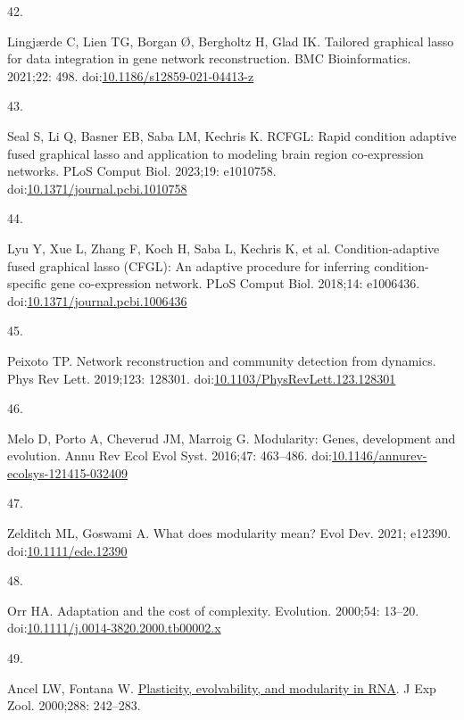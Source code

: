 \documentclass[
]{article}
\newlength{\cslhangindent}
\newlength{\csllabelwidth}
\newenvironment{CSLReferences}[2] %
 {\begin{list}{}{%
  \setlength{\itemindent}{0pt}
  \setlength{\leftmargin}{0pt}
  \setlength{\parsep}{0pt}
  \ifodd #1
   \setlength{\leftmargin}{\cslhangindent}
   \setlength{\itemindent}{-1\cslhangindent}
  \fi
  \setlength{\itemsep}{#2\baselineskip}}}
 {\end{list}}
\newcommand{\CSLLeftMargin}[1]{\parbox[t]{\csllabelwidth}{\strut#1\strut}}
\newcommand{\CSLRightInline}[1]{\parbox[t]{\linewidth - \csllabelwidth}{\strut#1\strut}}
\begin{document}
\begin{CSLReferences}{0}{1}
\CSLLeftMargin{42. }%
\CSLRightInline{Lingjærde C, Lien TG, Borgan Ø, Bergholtz H, Glad IK.
Tailored graphical lasso for data integration in gene network
reconstruction. BMC Bioinformatics. 2021;22: 498.
doi:\href{https://doi.org/10.1186/s12859-021-04413-z}{10.1186/s12859-021-04413-z}}

\CSLLeftMargin{43. }%
\CSLRightInline{Seal S, Li Q, Basner EB, Saba LM, Kechris K. {RCFGL}:
Rapid condition adaptive fused graphical lasso and application to
modeling brain region co-expression networks. PLoS Comput Biol. 2023;19:
e1010758.
doi:\href{https://doi.org/10.1371/journal.pcbi.1010758}{10.1371/journal.pcbi.1010758}}

\CSLLeftMargin{44. }%
\CSLRightInline{Lyu Y, Xue L, Zhang F, Koch H, Saba L, Kechris K, et al.
Condition-adaptive fused graphical lasso ({CFGL)}: An adaptive procedure
for inferring condition-specific gene co-expression network. PLoS Comput
Biol. 2018;14: e1006436.
doi:\href{https://doi.org/10.1371/journal.pcbi.1006436}{10.1371/journal.pcbi.1006436}}

\CSLLeftMargin{45. }%
\CSLRightInline{Peixoto TP. Network reconstruction and community
detection from dynamics. Phys Rev Lett. 2019;123: 128301.
doi:\href{https://doi.org/10.1103/PhysRevLett.123.128301}{10.1103/PhysRevLett.123.128301}}

\CSLLeftMargin{46. }%
\CSLRightInline{Melo D, Porto A, Cheverud JM, Marroig G. Modularity:
Genes, development and evolution. Annu Rev Ecol Evol Syst. 2016;47:
463--486.
doi:\href{https://doi.org/10.1146/annurev-ecolsys-121415-032409}{10.1146/annurev-ecolsys-121415-032409}}

\CSLLeftMargin{47. }%
\CSLRightInline{Zelditch ML, Goswami A. What does modularity mean? Evol
Dev. 2021; e12390.
doi:\href{https://doi.org/10.1111/ede.12390}{10.1111/ede.12390}}

\CSLLeftMargin{48. }%
\CSLRightInline{Orr HA. Adaptation and the cost of complexity.
Evolution. 2000;54: 13--20.
doi:\href{https://doi.org/10.1111/j.0014-3820.2000.tb00002.x}{10.1111/j.0014-3820.2000.tb00002.x}}

\CSLLeftMargin{49. }%
\CSLRightInline{Ancel LW, Fontana W.
\href{https://www.ncbi.nlm.nih.gov/pubmed/11069142}{Plasticity,
evolvability, and modularity in {RNA}}. J Exp Zool. 2000;288: 242--283.
}


\end{CSLReferences}
\end{document}

